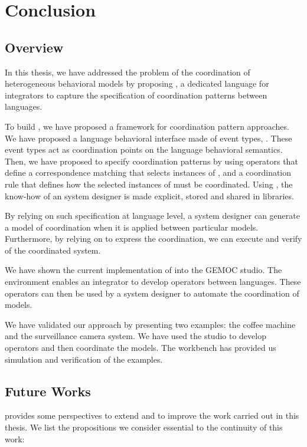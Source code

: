 \chapter{Conclusion}
\label{ch:conclusions}

\section{Overview}

In this thesis, we have addressed the problem of the coordination of heterogeneous behavioral models by proposing \bcool, a dedicated language for integrators to capture the specification of coordination patterns between languages. 
	
To build \bcool, we have proposed a framework for coordination pattern approaches. We have proposed a language behavioral interface made of event types, \ie \dse. These event types act as coordination points on the language behavioral semantics. Then, we have proposed to specify coordination patterns by using operators that define a correspondence matching that selects instances of \dse, and a coordination rule that defines how the selected instances of \dse must be coordinated. Using \bcool, the know-how of an system designer is made explicit, stored and shared in libraries.

By relying on such specification at language level, a system designer can generate a model of coordination when it is applied between particular models. Furthermore, by relying on \ccsl to express the coordination, we can execute and verify of the coordinated system.   
	
We have shown the current implementation of \bcool into the GEMOC studio. The environment enables an integrator to develop operators between languages. These operators can then be used by a system designer to automate the coordination of models. 
	
We have validated our approach by presenting two examples: the coffee machine and the surveillance camera system. We have used the studio to develop operators and then coordinate the models. The workbench has provided us simulation and verification of the examples. 
	  
\section{Future Works}
\bcool provides some perspectives to extend and to improve the work carried out in this thesis. We list the propositions we consider essential to the continuity of this work:

